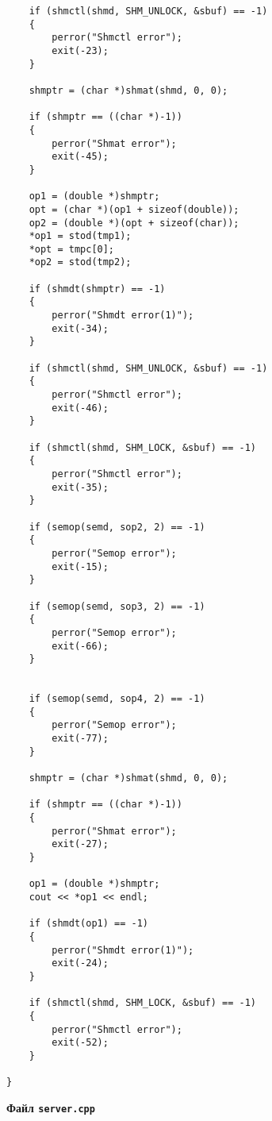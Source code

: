 \documentclass[a4paper,12pt]{extarticle}
\begin{document}
\begin{verbatim}
    if (shmctl(shmd, SHM_UNLOCK, &sbuf) == -1)
    {
        perror("Shmctl error");
        exit(-23);
    }

    shmptr = (char *)shmat(shmd, 0, 0);

    if (shmptr == ((char *)-1))
    {
        perror("Shmat error");
        exit(-45);
    }

    op1 = (double *)shmptr;
    opt = (char *)(op1 + sizeof(double));
    op2 = (double *)(opt + sizeof(char));
    *op1 = stod(tmp1);
    *opt = tmpc[0];
    *op2 = stod(tmp2);

    if (shmdt(shmptr) == -1)
    {
        perror("Shmdt error(1)");
        exit(-34);
    }

    if (shmctl(shmd, SHM_UNLOCK, &sbuf) == -1)
    {
        perror("Shmctl error");
        exit(-46);
    }

    if (shmctl(shmd, SHM_LOCK, &sbuf) == -1)
    {
        perror("Shmctl error");
        exit(-35);
    }

    if (semop(semd, sop2, 2) == -1)
    {
        perror("Semop error");
        exit(-15);
    }

    if (semop(semd, sop3, 2) == -1)
    {
        perror("Semop error");
        exit(-66);
    }


    if (semop(semd, sop4, 2) == -1)
    {
        perror("Semop error");
        exit(-77);
    }

    shmptr = (char *)shmat(shmd, 0, 0);

    if (shmptr == ((char *)-1))
    {
        perror("Shmat error");
        exit(-27);
    }

    op1 = (double *)shmptr;
    cout << *op1 << endl;

    if (shmdt(op1) == -1)
    {
        perror("Shmdt error(1)");
        exit(-24);
    }

    if (shmctl(shmd, SHM_LOCK, &sbuf) == -1)
    {
        perror("Shmctl error");
        exit(-52);
    }

}
\end{verbatim}
\centerline{\textbf{Файл \texttt{server.cpp}}}
\end{document}
